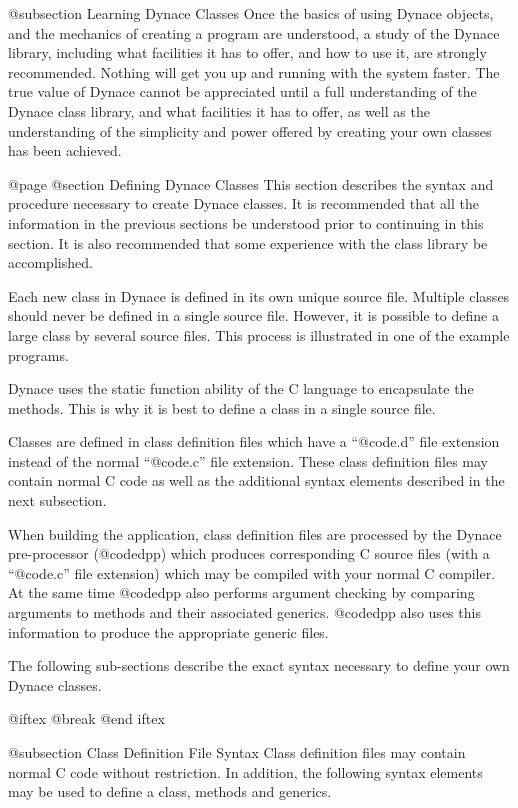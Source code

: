 @subsection Learning Dynace Classes
Once the basics of using Dynace objects, and the mechanics of creating a
program are understood, a study of the Dynace library, including what
facilities it has to offer, and how to use it, are strongly recommended.
Nothing will get you up and running with the system faster.  The true
value of Dynace cannot be appreciated until a full understanding of the Dynace
class library, and what facilities it has to offer, as well as the
understanding of the simplicity and power offered by creating your own
classes has been achieved.

@page
@section Defining Dynace Classes
This section describes the syntax and procedure necessary to create
Dynace classes.  It is recommended that all the information in the
previous sections be understood prior to continuing in this section.  It
is also recommended that some experience with the class library be
accomplished.

Each new class in Dynace is defined in its own unique source file.
Multiple classes should never be defined in a single source file.
However, it is possible to define a large class by several source files.
This process is illustrated in one of the example programs.

Dynace uses the static function ability of the C language to encapsulate
the methods.  This is why it is best to define a class in a single
source file.

Classes are defined in class definition files which have a
``@code{.d}'' file extension instead of the normal ``@code{.c}''
file extension.  These class definition files may contain normal
C code as well as the additional syntax elements described in the
next subsection.

When building the application, class definition files are processed
by the Dynace pre-processor (@code{dpp}) which produces corresponding
C source files (with a ``@code{.c}'' file extension) which may be
compiled with your normal C compiler.  At the same time @code{dpp}
also performs argument checking by comparing arguments to methods
and their associated generics.  @code{dpp} also uses this information
to produce the appropriate generic files.


The following sub-sections describe the exact syntax
necessary to define your own Dynace classes.

@iftex
@break
@end iftex

@subsection Class Definition File Syntax
Class definition files may contain normal C code without restriction.
In addition, the following syntax elements may be used to define a class,
methods and generics.


